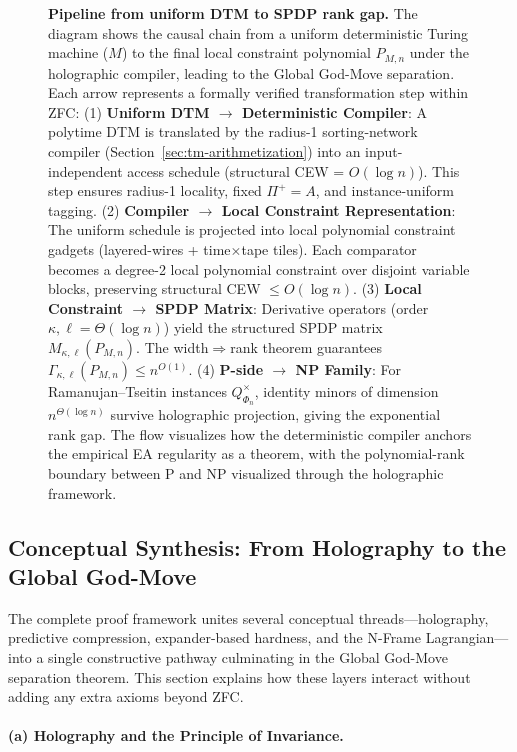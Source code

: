 \documentclass[12pt]{article}
\theoremstyle{definition}
\theoremstyle{definition}
\theoremstyle{remark}
\theoremstyle{remark}
\begin{document}
\begin{figure}[h!]
\begin{tikzpicture}
\end{tikzpicture}
\caption{\textbf{Pipeline from uniform DTM to SPDP rank gap.} The diagram shows the causal chain from a uniform deterministic Turing machine ($M$) to the final local constraint polynomial $P_{M,n}$ under the holographic compiler, leading to the Global God-Move separation. Each arrow represents a formally verified transformation step within ZFC: (1) \textbf{Uniform DTM $\to$ Deterministic Compiler}: A polytime DTM is translated by the radius-1 sorting-network compiler (Section~\ref{sec:tm-arithmetization}) into an input-independent access schedule (structural CEW = $O(\log n)$). This step ensures radius-1 locality, fixed $\Pi^+ = A$, and instance-uniform tagging. (2) \textbf{Compiler $\to$ Local Constraint Representation}: The uniform schedule is projected into local polynomial constraint gadgets (layered-wires + time$\times$tape tiles). Each comparator becomes a degree-2 local polynomial constraint over disjoint variable blocks, preserving structural CEW $\leq O(\log n)$. (3) \textbf{Local Constraint $\to$ SPDP Matrix}: Derivative operators (order $\kappa, \ell = \Theta(\log n)$) yield the structured SPDP matrix $M_{\kappa,\ell}(P_{M,n})$. The width$\Rightarrow$rank theorem guarantees $\Gamma_{\kappa,\ell}(P_{M,n}) \leq n^{O(1)}$. (4) \textbf{P-side $\to$ NP Family}: For Ramanujan--Tseitin instances $Q^{\times}_{\Phi_n}$, identity minors of dimension $n^{\Theta(\log n)}$ survive holographic projection, giving the exponential rank gap. The flow visualizes how the deterministic compiler anchors the empirical EA regularity as a theorem, with the polynomial-rank boundary between P and NP visualized through the holographic framework.}
\label{fig:deterministic-compilation-pipeline}
\end{figure}

\subsection{Conceptual Synthesis: From Holography to the Global God-Move}

The complete proof framework unites several conceptual threads---holography, predictive compression, expander-based hardness, and the N-Frame Lagrangian---into a single constructive pathway culminating in the Global God-Move separation theorem.
This section explains how these layers interact without adding any extra axioms beyond ZFC.

\paragraph{(a) Holography and the Principle of Invariance.}
\end{document}
